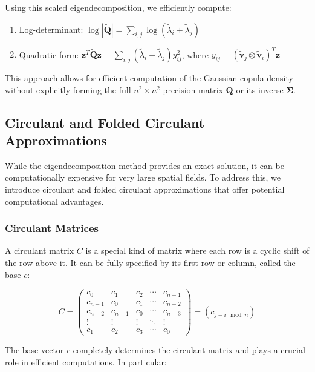 \documentclass[journal=,manuscript=]{achemso}
\begin{document}
Using this scaled eigendecomposition, we efficiently compute:

\begin{enumerate}
\def\labelenumi{\arabic{enumi}.}
\item
  Log-determinant:
  \(\log|\mathbf{\tilde Q}| = \sum_{i,j} \log(\tilde\lambda_i + \tilde\lambda_j)\)
\item
  Quadratic form:
  \(\mathbf{z}^T\mathbf{\tilde Q}\mathbf{z} = \sum_{i,j} (\tilde\lambda_i + \tilde\lambda_j) y_{ij}^2\),
  where
  \(y_{ij} = (\mathbf{\tilde v}_j \otimes \mathbf{\tilde v}_i)^T\mathbf{z}\)
\end{enumerate}

This approach allows for efficient computation of the Gaussian copula
density without explicitly forming the full \(n^2 \times n^2\) precision
matrix \(\mathbf{Q}\) or its inverse \(\mathbf{\Sigma}\).

\subsection{Circulant and Folded Circulant
Approximations}\label{circulant-and-folded-circulant-approximations}

While the eigendecomposition method provides an exact solution, it can
be computationally expensive for very large spatial fields. To address
this, we introduce circulant and folded circulant approximations that
offer potential computational advantages.

\subsubsection{Circulant Matrices}\label{circulant-matrices}

A circulant matrix \(C\) is a special kind of matrix where each row is a
cyclic shift of the row above it. It can be fully specified by its first
row or column, called the base \(c\):

\[
C = \begin{pmatrix}
c_0 & c_1 & c_2 & \cdots & c_{n-1} \\
c_{n-1} & c_0 & c_1 & \cdots & c_{n-2} \\
c_{n-2} & c_{n-1} & c_0 & \cdots & c_{n-3} \\
\vdots & \vdots & \vdots & \ddots & \vdots \\
c_1 & c_2 & c_3 & \cdots & c_0
\end{pmatrix} = (c_{j-i \mod n})
\]

The base vector \(c\) completely determines the circulant matrix and
plays a crucial role in efficient computations. In particular:
\end{document}
